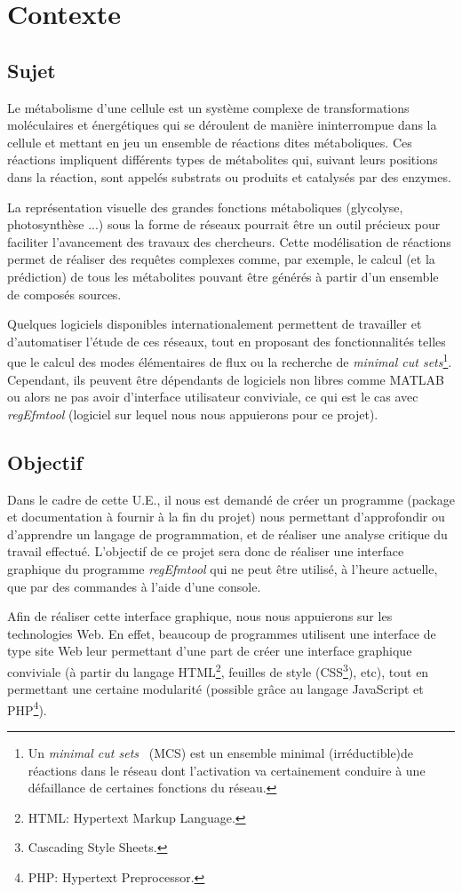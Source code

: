 \chapter{Contexte}

\section{Sujet}
Le métabolisme d'une cellule est un système complexe de transformations moléculaires et énergétiques qui se déroulent de manière ininterrompue dans la cellule et mettant en jeu un ensemble de réactions dites métaboliques. 
Ces réactions impliquent différents types de métabolites qui, suivant leurs positions dans la réaction, sont appelés substrats ou produits et catalysés par des enzymes.

La représentation visuelle des grandes fonctions métaboliques (glycolyse, photosynthèse ...) sous la forme de réseaux pourrait être un outil précieux pour faciliter l'avancement des travaux des chercheurs. Cette modélisation de réactions permet de réaliser des requêtes complexes comme, par exemple, le calcul (et la prédiction) de tous les métabolites pouvant être générés à partir d'un ensemble de composés sources.

Quelques logiciels disponibles internationalement permettent de travailler et d'automatiser l'étude de ces réseaux, tout en proposant des fonctionnalités telles que le calcul des modes élémentaires de flux ou la recherche de \textit{minimal cut sets}\footnote{Un \textit{minimal cut sets}~\cite{mcs:url} (MCS) est un ensemble minimal (irréductible)de réactions dans le réseau dont l'activation va certainement conduire à une défaillance de certaines fonctions du réseau.}.  Cependant, ils peuvent être dépendants de logiciels non libres comme MATLAB ou alors ne pas avoir d'interface utilisateur conviviale, ce qui est le cas avec  \emph{regEfmtool} (logiciel sur lequel nous nous appuierons pour ce projet).

\section{Objectif}
Dans le cadre de cette U.E., il nous est demandé de créer un programme (package et documentation à fournir à la fin du projet) nous permettant d'approfondir ou d'apprendre un langage de programmation, et de réaliser une analyse critique du travail effectué. L'objectif de ce projet sera donc de réaliser une interface graphique du programme  \emph{regEfmtool} qui ne peut être utilisé, à l'heure actuelle, que par des commandes à l'aide d'une console.

Afin de réaliser cette interface graphique, nous nous appuierons sur les technologies Web. En effet, beaucoup de programmes utilisent une interface de type site Web leur permettant d'une part de créer une interface graphique 
conviviale (à partir du langage HTML\footnote{HTML: Hypertext Markup Language.}, feuilles de style (CSS\footnote{Cascading Style Sheets.}), etc), tout en permettant une certaine modularité (possible grâce au langage JavaScript et PHP\footnote{PHP: Hypertext Preprocessor.}). 